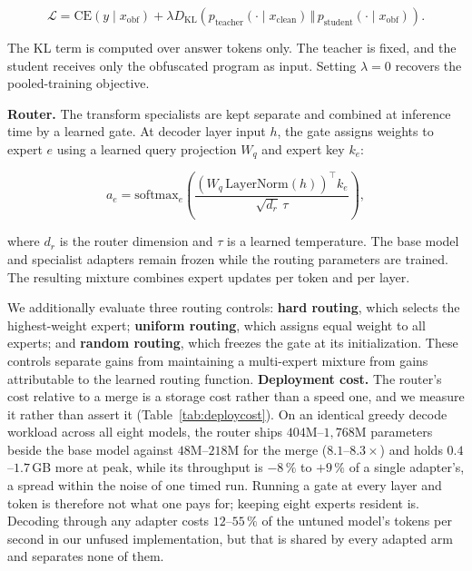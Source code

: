 \begin{equation}
\mathcal{L}
=
\mathrm{CE}\!\left(y \mid x_{\mathrm{obf}}\right)
+
\lambda
D_{\mathrm{KL}}\!\left(
p_{\mathrm{teacher}}(\cdot \mid x_{\mathrm{clean}})
\,\Vert\,
p_{\mathrm{student}}(\cdot \mid x_{\mathrm{obf}})
\right).
\label{eq:kl}
\end{equation}

The KL term is computed over answer tokens only. The teacher is fixed, and the
student receives only the obfuscated program as input. Setting $\lambda=0$
recovers the pooled-training objective.

\noindent\textbf{Router.}
The transform specialists are kept separate and combined at inference time by
a learned gate. At decoder layer input $h$, the gate assigns weights to expert
$e$ using a learned query projection $W_q$ and expert key $k_e$:

\begin{equation}
a_e
=
\mathrm{softmax}_e
\left(
\frac{
\left(W_q\,\mathrm{LayerNorm}(h)\right)^\top k_e
}{
\sqrt{d_r}\,\tau
}
\right),
\label{eq:gate}
\end{equation}

where $d_r$ is the router dimension and $\tau$ is a learned temperature.
The base model and specialist adapters remain frozen while the routing
parameters are trained. The resulting mixture combines expert updates
per token and per layer.

We additionally evaluate three routing controls: \textbf{hard routing}, which
selects the highest-weight expert; \textbf{uniform routing}, which assigns equal
weight to all experts; and \textbf{random routing}, which freezes the gate at
its initialization. These controls separate gains from maintaining a
multi-expert mixture from gains attributable to the learned routing function.
\noindent\textbf{Deployment cost.} The router's cost relative to a merge is a storage cost rather
than a speed one, and we measure it rather than assert it (Table~\ref{tab:deploycost}). On an
identical greedy decode workload across all eight models, the router ships $404$M--$1{,}768$M
parameters beside the base model against $48$M--$218$M for the merge ($8.1$--$8.3\times$) and holds
$0.4$--$1.7$\,GB more at peak, while its throughput is $-8\,\%$ to $+9\,\%$ of a single adapter's,
a spread within the noise of one timed run. Running a gate at every layer and token is therefore not
what one pays for; keeping eight experts resident is. Decoding through any adapter costs $12$--$55\,\%$
of the untuned model's tokens per second in our unfused implementation, but that is shared by every
adapted arm and separates none of them.



